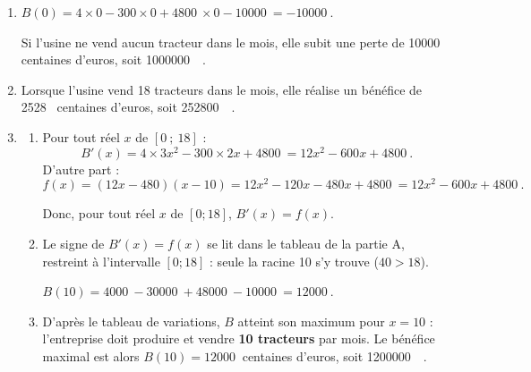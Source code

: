 \documentclass[10pt]{article}
\providecommand{\euro}{\texteuro}
\providecommand{\np}[2][]{{#2~#1}}
\providecommand{\euro}{{\text{€}}}
\renewcommand{\euro}{\ifmmode\text{\texteuro}\else\texteuro\fi}
\begin{document}
\begin{enumerate}
	\item $B(0) = 4 \times 0 - 300 \times 0 + \np{4800} \times 0 - \np{10000} = -\np{10000}$.

	Si l'usine ne vend aucun tracteur dans le mois, elle subit une perte
	de \np{10000} centaines d'euros, soit \np{1000000}~\euro.

	\item Lorsque l'usine vend 18 tracteurs dans le mois, elle réalise un bénéfice de \np{2528}
	centaines d'euros, soit \np{252800}~\euro.

	\item
	\begin{enumerate}
		\item Pour tout réel $x$ de $[0~;~18]$ :
		\[B'(x) = 4 \times 3x^2 - 300 \times 2x + \np{4800} = 12x^2 - 600x + \np{4800}.\]
		D'autre part :
		\[f(x) = (12x - 480)(x - 10) = 12x^2 - 120x - 480x + \np{4800} = 12x^2 - 600x + \np{4800}.\]

Donc, pour tout réel $x$ de $[0 ; 18]$, $B'(x) = f(x)$.

		\item Le signe de $B'(x) = f(x)$ se lit dans le tableau de la partie A, restreint à
		l'intervalle $[0 ; 18]$ : seule la racine 10 s'y trouve ($40 > 18$).

		$B(10) = \np{4000} - \np{30000} + \np{48000} - \np{10000} = \np{12000}$.

		\begin{center}
		\end{center}

		\item D'après le tableau de variations, $B$ atteint son maximum pour $x = 10$ : l'entreprise
		doit produire et vendre \textbf{10 tracteurs} par mois. Le bénéfice maximal est alors
		$B(10) = \np{12000}$ centaines d'euros, soit \np{1200000}~\euro.
	\end{enumerate}
\end{enumerate}

\medskip
\end{document}
